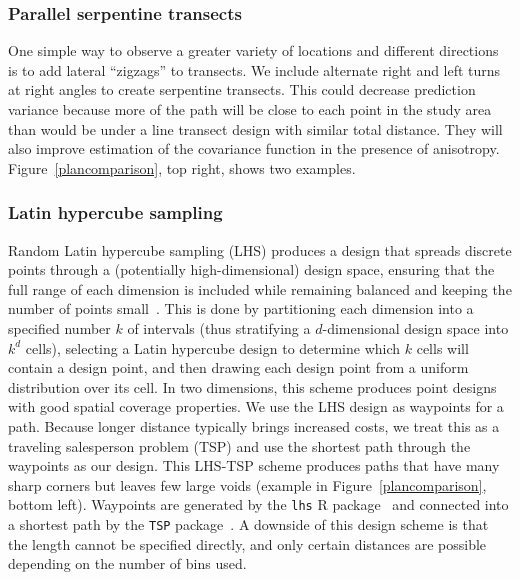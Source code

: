 \documentclass[review]{elsarticle}
\begin{document}
\subsubsection{Parallel serpentine transects}

One simple way to observe a greater variety of locations and different
directions is to add lateral ``zigzags'' to transects. We include alternate
right and left turns at right angles to create serpentine transects. This could
decrease prediction variance because more of the path will be close to each
point in the study area than would be under a line transect design with similar
total distance. They will also improve estimation of the covariance function
in the presence of anisotropy. Figure~\ref{plancomparison}, top right, shows
two examples.



\subsubsection{Latin hypercube sampling}

Random Latin hypercube sampling (LHS) produces a design that spreads discrete
points through a (potentially high-dimensional) design space, ensuring that
the full range of each dimension is included while remaining balanced and
keeping the number of points small~\citep{mckayetal}. This is done by
partitioning each dimension into a specified number \(k\) of intervals (thus
stratifying a \(d\)-dimensional design space into \(k^{d}\) cells), selecting
a Latin hypercube design to determine which \(k\) cells will contain a design
point, and then drawing each design point from a uniform distribution over its
cell. In two dimensions, this scheme produces point designs with good spatial
coverage properties. We use the LHS design as waypoints for a path. Because
longer distance typically brings increased costs, we treat this as a traveling
salesperson problem (TSP) and use the shortest path through the waypoints as
our design. This LHS-TSP scheme produces paths that have many sharp corners but
leaves few large voids (example in Figure~\ref{plancomparison}, bottom left).
Waypoints are generated by the \texttt{lhs} R package~\citep{lhs} and connected
into a shortest path by the \texttt{TSP} package~\citep{tsp}. A downside of
this design scheme is that the length cannot be specified directly, and only
certain distances are possible depending on the number of bins used.
\end{document}
